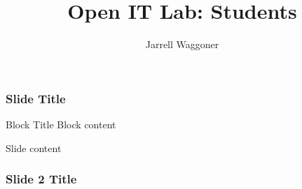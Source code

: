 \documentclass{beamer}
\title[OpenIT Lab]{Open IT Lab: Students}
\author{Jarrell Waggoner}
\institute[OIL] {Open IT Lab\\
  \medskip
      {\emph{waggonej@email.sc.edu}} }
\begin{document}
\rm

\begin{frame}
  \titlepage
\end{frame}

\begin{frame}
  \frametitle{Slide Title}
  \begin{block}
    {Block Title} Block content
  \end{block}
  Slide content
\end{frame}

\begin{frame}
  \frametitle{Slide 2 Title}

\end{frame}
\end{document}
